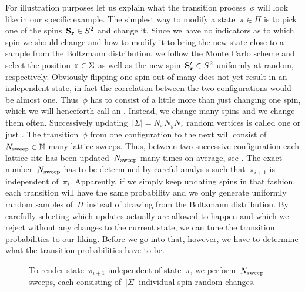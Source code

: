 For illustration purposes let us explain what the transition process~$\phi$ will
look like in our specific example. The simplest way to modify a state~$\pi \in
\Pi$ is to pick one of the spins~$\mathbf{S}_{\mathbf{r}} \in S^2$ and change it. Since we have
no indicators as to which spin we should change and how to modify it to bring
the new state close to a sample from the Boltzmann distribution, we follow the
Monte Carlo scheme and select the position~$\mathbf{r} \in \Sigma$ as well as the new
spin~$\mathbf{S}'_{\mathbf{r}}\in S^2$ uniformly at random, respectively. Obviously flipping one
spin out of many does not yet result in an independent state, in fact the
correlation between the two configurations would be almost one. Thus~$\phi$ has
to consist of a little more than just changing one spin, which we will
henceforth call an . Instead, we change many spins and we change
them often. Successively updating~$|\Sigma| = N_x N_y N_z$ random vertices is
called one  or just . The
transition~$\phi$ from one configuration to the next will consist of~$N_{\mathrm{sweep}}
\in \mathbb{N}$ many lattice sweeps. Thus, between two successive configuration each
lattice site has been updated~$N_{\mathrm{sweep}}$ many times on average, see
. The exact number~$N_{\mathrm{sweep}}$ has to be determined by careful
analysis such that~$\pi_{i+1}$ is independent of~$\pi_i$. Apparently, if we
simply keep updating spins in that fashion, each transition will have the same
probability and we only generate uniformly random samples of~$\Pi$ instead of
drawing from the Boltzmann distribution. By carefully selecting which updates
actually are allowed to happen and which we reject without any changes to the
current state, we can tune the transition probabilities to our liking. Before we
go into that, however, we have to determine what the transition probabilities
have to be.

\begin{figure}
  \centering
  \caption{To render state~$\pi_{i+1}$ independent of state~$\pi$, we
  perform~$N_{\mathrm{sweep}}$ sweeps, each consisting of~$|\Sigma|$ individual spin
  random changes.}
\label{fig:update}
\end{figure}

